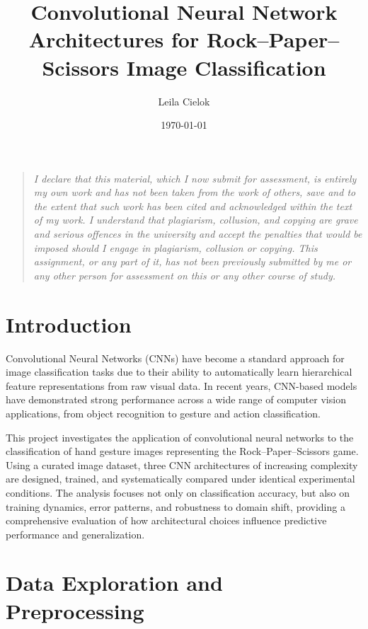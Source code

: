 \documentclass{article}
\title{Convolutional Neural Network Architectures for Rock--Paper--Scissors Image Classification}
\author{Leila Cielok}
\date{\today}
\begin{document}
\maketitle

\vspace{1cm}

\begin{quote}
\small
\textit{
I declare that this material, which I now submit for assessment, is entirely my
own work and has not been taken from the work of others, save and to the extent
that such work has been cited and acknowledged within the text of my work. I
understand that plagiarism, collusion, and copying are grave and serious offences
in the university and accept the penalties that would be imposed should I engage
in plagiarism, collusion or copying. This assignment, or any part of it, has not
been previously submitted by me or any other person for assessment on this or any
other course of study.
}
\end{quote}

\vspace{1cm}


\section*{Introduction}

Convolutional Neural Networks (CNNs) have become a standard approach for image
classification tasks due to their ability to automatically learn hierarchical
feature representations from raw visual data. In recent years, CNN-based models
have demonstrated strong performance across a wide range of computer vision
applications, from object recognition to gesture and action classification.

This project investigates the application of convolutional neural networks to
the classification of hand gesture images representing the Rock--Paper--Scissors
game. Using a curated image dataset, three CNN architectures of increasing
complexity are designed, trained, and systematically compared under identical
experimental conditions. The analysis focuses not only on classification
accuracy, but also on training dynamics, error patterns, and robustness to
domain shift, providing a comprehensive evaluation of how architectural
choices influence predictive performance and generalization.

\section{Data Exploration and Preprocessing}
\end{document}
